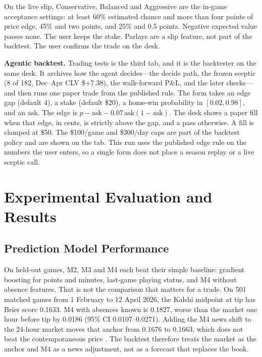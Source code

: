 \documentclass[11pt,a4paper]{article}
\begin{document}
On the live slip, Conservative, Balanced and Aggressive are the in-game
acceptance settings: at least 60\% estimated chance and more than four points
of price edge, 45\% and two points, and 25\% and 0.5 points. Negative expected
value passes none. The user keeps the stake. Parlays are a slip feature, not
part of the backtest. The user confirms the trade on the desk.

\textbf{Agentic backtest.} Trading tests is the third tab, and it is the
backtester on the same desk. It archives how the agent decides---the decide
path, the frozen sceptic (8 of 182, Dec--Apr CLV \$+7.38), the walk-forward
P\&L, and the later checks---and then runs one paper trade from the published
rule. The form takes an edge gap (default 4\textcent), a stake (default \$20),
a home-win probability in $[0.02,0.98]$, and an ask. The edge is
$p-\mathrm{ask}-0.07\,\mathrm{ask}(1-\mathrm{ask})$. The desk shows a paper
fill when that edge, in cents, is strictly above the gap, and a pass
otherwise. A fill is clamped at \$50. The \$100/game and \$300/day caps are
part of the backtest policy and are shown on the tab. This run uses the
published edge rule on the numbers the user enters, so a single form does not
place a season replay or a live sceptic call.
\label{sec:implementation-end}


\section{Experimental Evaluation and Results}
\subsection{Prediction Model Performance}
\label{sec:prediction_performance}
On held-out games, M2, M3 and M4 each beat their simple baseline: gradient
boosting for points and minutes, last-game playing status, and M4 without
absence features. That is not the comparison that matters for a trade. On
501 matched games from 1 February to 12 April 2026, the Kalshi midpoint at
tip has Brier score 0.1633. M4 with absences known is 0.1827, worse than the
market one hour before tip by 0.0186 (95\% CI 0.0107--0.0271). Adding the M4
news shift to the 24-hour market moves that anchor from 0.1676 to 0.1663,
which does not beat the contemporaneous price \cite{data-models}. The
backtest therefore treats the market as the anchor and M4 as a news
adjustment, not as a forecast that replaces the book.
\end{document}
